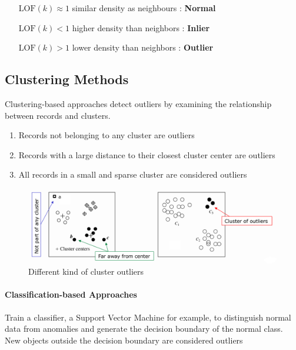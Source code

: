 \documentclass[11pt]{article}
\begin{document}
\begin{itemize}[leftmargin=*, labelindent=2cm, labelsep=1cm]
    \item[$\text{LOF}(k) \approx 1$] similar density as neighbours : \textbf{Normal}
    \item[$\text{LOF}(k) < 1$] higher density than neighbors : \textbf{Inlier}
    \item[$\text{LOF}(k) > 1$]  lower density than neighbors : \textbf{Outlier}
\end{itemize}

\subsection{Clustering Methods}

Clustering-based approaches detect outliers by examining the relationship between records and clusters.

\begin{enumerate}
    \item Records not belonging to any cluster are outliers
    \item Records with a large distance to their closest cluster center are outliers
    \item All records in a small and sparse cluster are considered outliers
\end{enumerate}

\begin{figure}[tbh!]
    \centering
    \includegraphics[width=0.7\linewidth, keepaspectratio]{Pictures/outlier_clustering_method}
    \caption{Different kind of cluster outliers}
    \label{fig:outlierclusteringmethod}
\end{figure}

\paragraph{Classification-based Approaches}

Train a classifier, a Support Vector Machine for example, to distinguish normal data from anomalies and generate the decision boundary of the normal class. New objects outside the decision boundary are considered outliers
\end{document}
